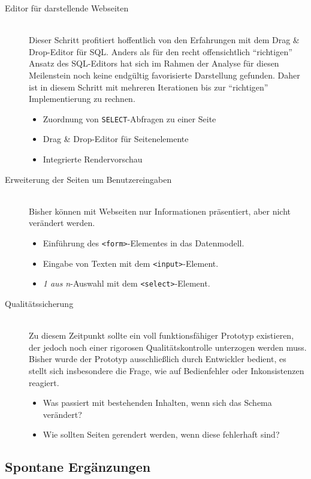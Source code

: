 \begin{description}
\item [Editor für darstellende Webseiten] \hfill \\
  Dieser Schritt profitiert hoffentlich von den Erfahrungen mit dem Drag \& Drop-Editor für SQL. Anders als für den recht offensichtlich "`richtigen"' Ansatz des SQL-Editors hat sich im Rahmen der Analyse für diesen Meilenstein noch keine endgültig favorisierte Darstellung gefunden. Daher ist in diesem Schritt mit mehreren Iterationen bis zur "`richtigen"' Implementierung zu rechnen.
  \begin{itemize}[noitemsep]
  \item Zuordnung von \texttt{SELECT}-Abfragen zu einer Seite
  \item Drag \& Drop-Editor für Seitenelemente
  \item Integrierte Rendervorschau
  \end{itemize}
  
\item[Erweiterung der Seiten um Benutzereingaben] \hfill \\
  Bisher können mit Webseiten nur Informationen präsentiert, aber nicht verändert werden.
  \begin{itemize}[noitemsep]
  \item Einführung des \texttt{<form>}-Elementes in das Datenmodell.
  \item Eingabe von Texten mit dem \texttt{<input>}-Element.
  \item \textit{1 aus n}-Auswahl mit dem \texttt{<select>}-Element.
  \end{itemize}
  
\item [Qualitätssicherung] \hfill \\
  Zu diesem Zeitpunkt sollte ein voll funktionsfähiger Prototyp existieren, der jedoch noch einer rigorosen Qualitätskontrolle unterzogen werden muss. Bisher wurde der Prototyp ausschließlich durch Entwickler bedient, es stellt sich insbesondere die Frage, wie \idename{} auf Bedienfehler oder Inkonsistenzen reagiert.
  \begin{itemize}[noitemsep]
  \item Was passiert mit bestehenden Inhalten, wenn sich das Schema verändert?
  \item Wie sollten Seiten gerendert werden, wenn diese fehlerhaft sind?
  \end{itemize}
\end{description}

\subsection{Spontane Ergänzungen}

